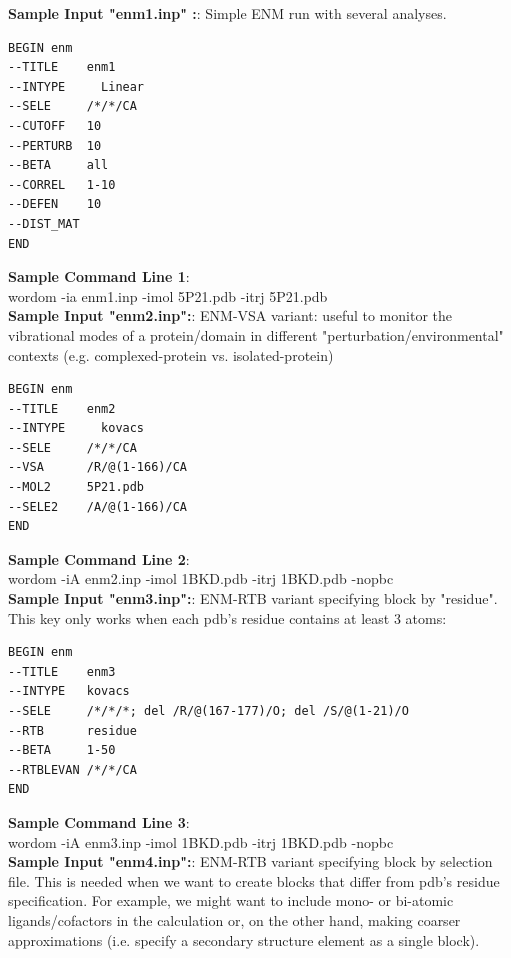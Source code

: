 \documentclass[11pt,twoside,onecolumn,a4paper,openright,notitlepage]{book}[2001/04/21]
\begin{document}
\textbf{\large Sample Input "enm1.inp" :}:
 Simple ENM run with several analyses.
\begin{verbatim}
BEGIN enm
--TITLE    enm1
--INTYPE     Linear
--SELE     /*/*/CA
--CUTOFF   10
--PERTURB  10
--BETA     all
--CORREL   1-10
--DEFEN    10
--DIST_MAT
END
\end{verbatim}

\textbf{\large Sample Command Line 1}:\\
\textsf{\large wordom -ia enm1.inp -imol 5P21.pdb -itrj 5P21.pdb}\\


\textbf{\large Sample Input "enm2.inp":}:
ENM-VSA variant: useful to monitor the vibrational modes of a protein/domain in different "perturbation/environmental" contexts (e.g. complexed-protein vs. isolated-protein)\\
\begin{verbatim}
BEGIN enm
--TITLE    enm2
--INTYPE     kovacs
--SELE     /*/*/CA
--VSA      /R/@(1-166)/CA
--MOL2     5P21.pdb
--SELE2    /A/@(1-166)/CA
END
\end{verbatim}

\textbf{\large Sample Command Line 2}:\\
\textsf{\large wordom -iA enm2.inp -imol 1BKD.pdb -itrj 1BKD.pdb -nopbc}\\

\textbf{\large Sample Input "enm3.inp":}:
ENM-RTB variant specifying block by "residue". This key only works when each pdb's residue contains at least 3 atoms: 
\begin{verbatim}
BEGIN enm
--TITLE    enm3
--INTYPE   kovacs
--SELE     /*/*/*; del /R/@(167-177)/O; del /S/@(1-21)/O
--RTB      residue
--BETA     1-50
--RTBLEVAN /*/*/CA
END
\end{verbatim}

\textbf{\large Sample Command Line 3}:\\
\textsf{\large wordom -iA enm3.inp -imol 1BKD.pdb -itrj 1BKD.pdb -nopbc}\\

\textbf{\large Sample Input "enm4.inp":}:
ENM-RTB variant specifying block by selection file. This is needed when we want to create blocks that differ from pdb's residue specification. 
For example, we might want to include mono- or bi-atomic ligands/cofactors in the calculation or, on the other hand, making coarser approximations (i.e. specify a secondary structure element as a single block).  
\end{document}
